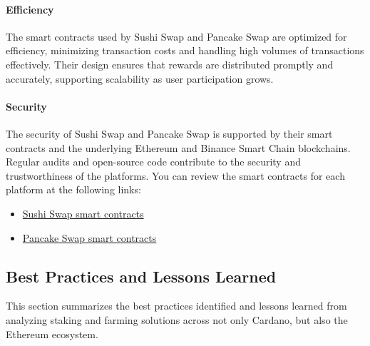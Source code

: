 \documentclass[12pt,parskip=full, tikz]{article}
\begin{document}
\paragraph{Efficiency}
The smart contracts used by Sushi Swap and Pancake Swap are optimized for efficiency, minimizing transaction costs and handling high volumes of transactions effectively. Their design ensures that rewards are distributed promptly and accurately, supporting scalability as user participation grows.

\paragraph{Security}
The security of Sushi Swap and Pancake Swap is supported by their smart contracts and the underlying Ethereum and Binance Smart Chain blockchains. Regular audits and open-source code contribute to the security and trustworthiness of the platforms. You can review the smart contracts for each platform at the following links:
\begin{itemize}
    \item \href{https://github.com/Cori1109/sushiswap/tree/canary/contracts}{Sushi Swap smart contracts}
    \item \href{https://github.com/pancakeswap/pancake-smart-contracts/tree/master/projects/farms-pools/contracts}{Pancake Swap smart contracts}
\end{itemize}


\subsection{Best Practices and Lessons Learned}

This section summarizes the best practices identified and lessons learned from analyzing staking and farming solutions across not only Cardano, but also the Ethereum ecosystem.
\end{document}
